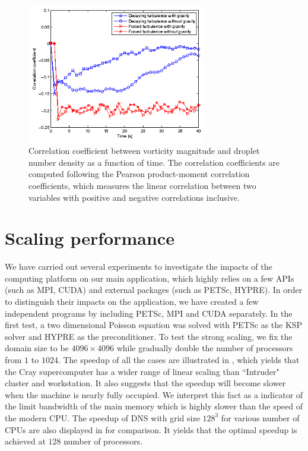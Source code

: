 \begin{figure}[!htbp]\centering
\includegraphics[width=0.7\textwidth]{Figures/correlation} \caption{Correlation
coefficient between vorticity magnitude and droplet number density as a
function of time. The correlation coefficients are computed following the
Pearson product-moment correlation coefficients, which measures the linear
correlation between two variables with positive and negative correlations
inclusive.\label{fig:correlation}} \end{figure}

\section{Scaling performance}
We have carried out several experiments to investigate the impacts of the
computing platform on our main application, which highly relies on a
few APIs (such as MPI, CUDA) and external packages (such as
PETSc, HYPRE).  In order to distinguish their impacts on the application, we have
created a few independent programs by including PETSc, MPI and CUDA separately.
In the first test, a two dimensional Poisson equation was solved with PETSc as
the KSP solver and HYPRE as the preconditioner. To test the strong scaling, we
fix the domain size to be $4096\times 4096$ while gradually double the number
of processors from $1$ to $1024$. The speedup of all the cases are illustrated in , 
which yields that the Cray supercomputer has a wider range of linear scaling than ``Intruder" cluster
and workstation. It also suggests that the speedup will become slower
when the machine is nearly fully occupied. We interpret this fact as a
indicator of the limit bandwidth of the main memory which is highly slower than
the speed of the modern CPU. The speedup of DNS with grid size $128^3$ for various 
number of CPUs are also displayed in  for comparison. It yields 
that the optimal speedup is achieved at $128$ number of processors.  

